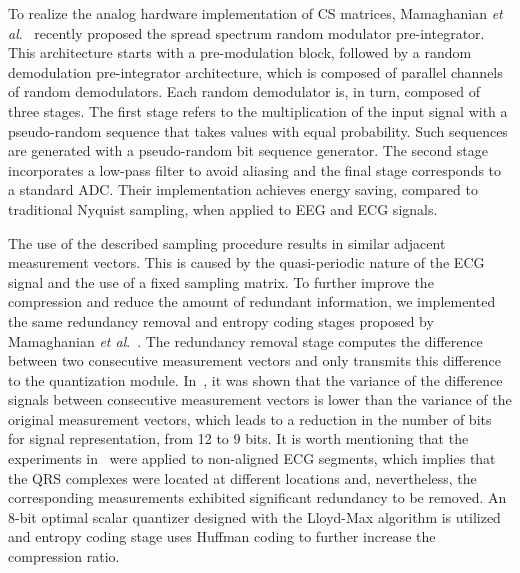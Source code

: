 \documentclass[journal]{IEEEtran}
\begin{document}
To realize the analog hardware implementation of CS matrices, Mamaghanian \textit{et al}.~\cite{Mama12} recently proposed the spread spectrum random modulator pre-integrator. This architecture starts with a pre-modulation block, followed by a random demodulation pre-integrator architecture, which is composed of parallel channels of random demodulators. Each random demodulator is, in turn, composed of three stages. The first stage refers to the multiplication of the input signal with a pseudo-random sequence that takes values  with equal probability. Such sequences are generated with a pseudo-random bit sequence generator. The second stage incorporates a low-pass filter to avoid aliasing and the final stage corresponds to a standard ADC. Their implementation achieves  energy saving, compared to traditional Nyquist sampling, when applied to EEG and ECG signals.

The use of the described sampling procedure results in similar adjacent measurement vectors. This is caused by the quasi-periodic nature of the ECG signal and the use of a fixed sampling matrix. To further improve the compression and reduce the amount of redundant information, we implemented the same redundancy removal and entropy coding stages proposed by Mamaghanian \textit{et al}.~\cite{Mama11}. The redundancy removal stage computes the difference between two consecutive measurement vectors and only transmits this difference to the quantization module. In~\cite{Mama11}, it was shown that the variance of the difference signals between consecutive measurement vectors is lower than the variance of the original measurement vectors, which leads to a reduction in the number of bits for signal representation, from 12 to 9 bits. It is worth mentioning that the experiments in~\cite{Mama11} were applied to non-aligned ECG segments, which implies that the QRS complexes were located at different locations and, nevertheless, the corresponding measurements exhibited significant redundancy to be removed. An 8-bit optimal scalar quantizer designed with the Lloyd-Max algorithm is utilized~\cite{Gers92} and entropy coding stage uses Huffman coding to further increase the compression ratio.
\end{document}
